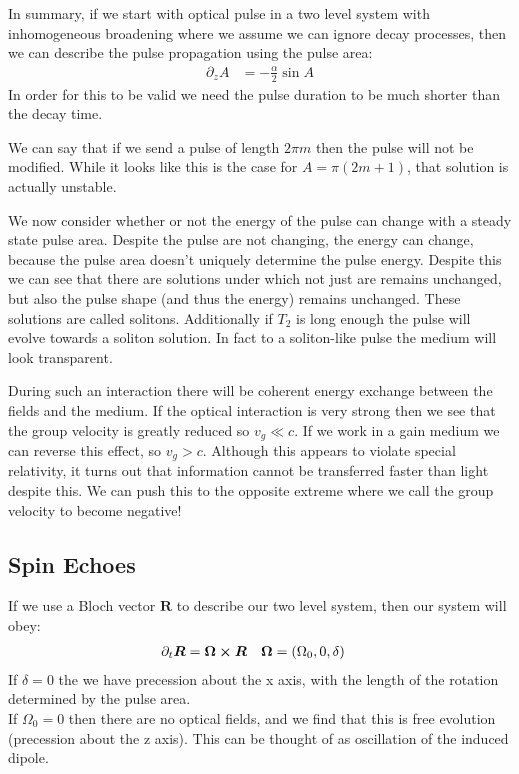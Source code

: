 In summary, if we start with optical pulse in a two level system with inhomogeneous broadening where we assume we can ignore decay processes, then we can describe the pulse propagation using the pulse area:
\begin{align*}
	\partial_z A &= -\frac{\alpha}{2}\sin A
\end{align*}
In order for this to be valid we need the pulse duration to be much shorter than the decay time.

We can say that if we send a pulse of length $2\pi m$ then the pulse will not be modified. While it looks like this is the case for $A = \pi(2m+1)$, that solution is actually unstable.

We now consider whether or not the energy of the pulse can change with a steady state pulse area. Despite the pulse are not changing, the energy can change, because the pulse area doesn't uniquely determine the pulse energy.
Despite this we can see that there are solutions under which not just are remains unchanged, but also the pulse shape (and thus the energy) remains unchanged. These solutions are called solitons.
Additionally if $T_2$ is long enough the pulse will evolve towards a soliton solution. In fact to a soliton-like pulse the medium will look transparent.

During such an interaction there will be coherent energy exchange between the fields and the medium. If the optical interaction is very strong then we see that the group velocity is greatly reduced so $v_g \ll c$.
If we work in a gain medium we can reverse this effect, so $v_g > c$. Although this appears to violate special relativity, it turns out that information cannot be transferred faster than light despite this.
We can push this to the opposite extreme where we call the group velocity to become negative!
\subsection{Spin Echoes}
If we use a Bloch vector $\bm{R}$ to describe our two level system, then our system will obey:
\begin{align*}
	\partial_t \bm{R} &= \bm{\Omega}\cross\bm{R} &
	\bm{\Omega} &= (\Omega_0, 0 , \delta)
\end{align*}
If $\delta = 0$ the we have precession about the x axis, with the length of the rotation determined by the pulse area. \\
If $\Omega_0 = 0$ then there are no optical fields, and we find that this is free evolution (precession about the z axis). This can be thought of as oscillation of the induced dipole.

